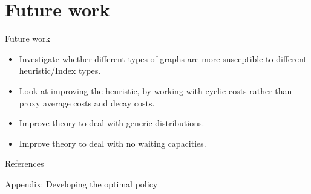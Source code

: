 \documentclass[10pt]{beamer}
\begin{document}
\section{Future work}
\begin{frame}{Future work}
\begin{itemize}
\item Investigate whether different types of graphs are more susceptible to different heuristic/Index types.
\item Look at improving the heuristic, by working with cyclic costs rather than proxy average costs and decay costs.
\item Improve theory to deal with generic distributions.
\item Improve theory to deal with no waiting capacities.
\end{itemize}
\end{frame}

\begin{frame}{References}

\end{frame}


\begin{frame}

\begin{center}
\Huge Appendix: Developing the optimal policy
\end{center}

\end{frame}
\end{document}
